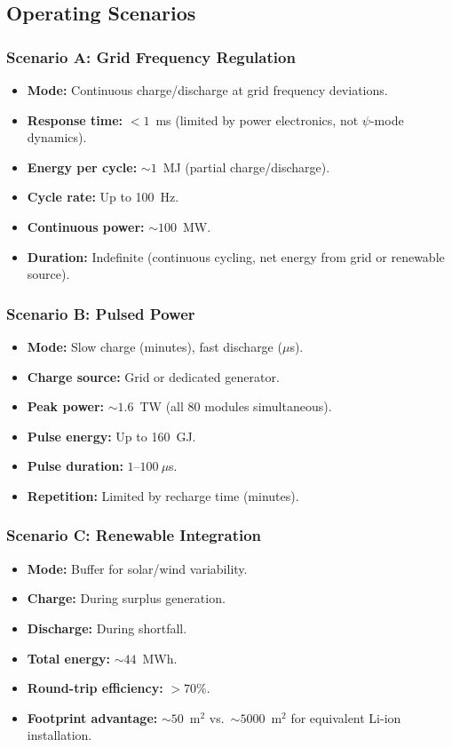 \documentclass[11pt,a4paper]{article}
\begin{document}
\subsection{Operating Scenarios}

\subsubsection{Scenario A: Grid Frequency Regulation}

\begin{itemize}
\item \textbf{Mode:} Continuous charge/discharge at grid frequency
  deviations.
\item \textbf{Response time:} $< 1$~ms (limited by power electronics,
  not $\psi$-mode dynamics).
\item \textbf{Energy per cycle:} $\sim 1$~MJ (partial charge/discharge).
\item \textbf{Cycle rate:} Up to 100~Hz.
\item \textbf{Continuous power:} $\sim 100$~MW.
\item \textbf{Duration:} Indefinite (continuous cycling, net energy from
  grid or renewable source).
\end{itemize}

\subsubsection{Scenario B: Pulsed Power}

\begin{itemize}
\item \textbf{Mode:} Slow charge (minutes), fast discharge ($\mu$s).
\item \textbf{Charge source:} Grid or dedicated generator.
\item \textbf{Peak power:} $\sim 1.6$~TW (all 80 modules simultaneous).
\item \textbf{Pulse energy:} Up to 160~GJ.
\item \textbf{Pulse duration:} $1$--$100~\mu$s.
\item \textbf{Repetition:} Limited by recharge time (minutes).
\end{itemize}

\subsubsection{Scenario C: Renewable Integration}

\begin{itemize}
\item \textbf{Mode:} Buffer for solar/wind variability.
\item \textbf{Charge:} During surplus generation.
\item \textbf{Discharge:} During shortfall.
\item \textbf{Total energy:} $\sim 44$~MWh.
\item \textbf{Round-trip efficiency:} $> 70\%$.
\item \textbf{Footprint advantage:} $\sim 50$~m$^2$ vs.\ $\sim 5000$~m$^2$
  for equivalent Li-ion installation.
\end{itemize}
\end{document}
